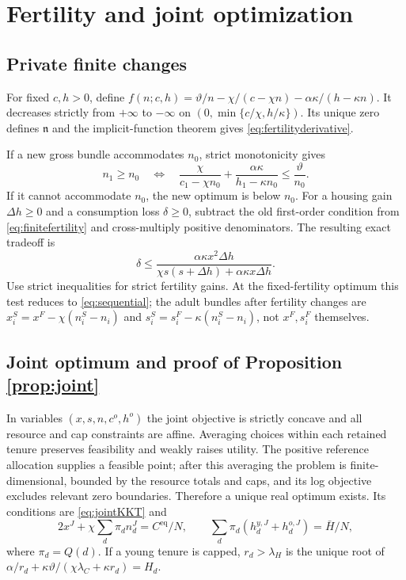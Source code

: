 \documentclass[11pt]{article}
\newcommand{\eq}{\mathrm{eq}}
\newcommand{\HH}{\bar H}
\newcommand{\tht}{\vartheta}
\begin{document}
\section{Fertility and joint optimization}\label{app:joint}
\subsection{Private finite changes}
For fixed $c,h>0$, define
$f(n;c,h)=\tht/n-\chi/(c-\chi n)-\alpha\kappa/(h-\kappa n)$.
It decreases strictly from $+\infty$ to $-\infty$ on
$(0,\min\{c/\chi,h/\kappa\})$. Its unique zero defines $\mathfrak n$ and the implicit-function theorem gives \eqref{eq:fertilityderivative}.

If a new gross bundle accommodates $n_0$, strict monotonicity gives
\begin{equation}
 n_1\ge n_0\quad\Longleftrightarrow\quad
 \frac\chi{c_1-\chi n_0}+\frac{\alpha\kappa}{h_1-\kappa n_0}
 \le\frac\tht{n_0}.\label{eq:finitefertility}
\end{equation}
If it cannot accommodate $n_0$, the new optimum is below $n_0$. For a housing gain $\Delta h\ge0$ and a consumption loss $\delta\ge0$, subtract the old first-order condition from \eqref{eq:finitefertility} and cross-multiply positive denominators. The resulting exact tradeoff is
\begin{equation}
 \delta\le
 \frac{\alpha\kappa x^2\Delta h}
 {\chi s(s+\Delta h)+\alpha\kappa x\Delta h}.\label{eq:finitecost}
\end{equation}
Use strict inequalities for strict fertility gains. At the fixed-fertility optimum this test reduces to \eqref{eq:sequential}; the adult bundles after fertility changes are
$x_i^S=x^F-\chi(n_i^S-n_i)$ and
$s_i^S=s_i^F-\kappa(n_i^S-n_i)$, not $x^F,s_i^F$ themselves.

\subsection{Joint optimum and proof of Proposition \ref{prop:joint}}
In variables $(x,s,n,c^o,h^o)$ the joint objective is strictly concave and all resource and cap constraints are affine. Averaging choices within each retained tenure preserves feasibility and weakly raises utility. The positive reference allocation supplies a feasible point; after this averaging the problem is finite-dimensional, bounded by the resource totals and caps, and its log objective excludes relevant zero boundaries. Therefore a unique real optimum exists. Its conditions are \eqref{eq:jointKKT} and
\begin{equation}
 2x^J+\chi\sum_d\pi_dn_d^J=C^{\eq}/N,\qquad
 \sum_d\pi_d(h_d^{y,J}+h_d^{o,J})=\HH/N,\label{eq:jointresources}
\end{equation}
where $\pi_d=Q(d)$. If a young tenure is capped, $r_d>\lambda_H$ is the unique root of
$\alpha/r_d+\kappa\tht/(\chi\lambda_C+\kappa r_d)=H_d$.
\end{document}

